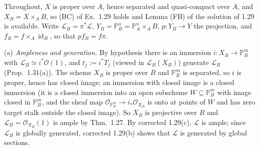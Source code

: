 \documentclass[11pt]{article}
\begin{document}
\pf
Throughout, $X$ is proper over $A$, hence separated and quasi-compact over $A$, and $X_B=X\times_AB$, so (BC) of Ex.~1.29 holds and Lemma (FB) of the solution of 1.29 is available. Write $\mathcal{L}_B=\pi^*\mathcal{L}$, $Y_B=\mathbb{P}^n_B=\mathbb{P}^n_A\times_AB$, $p:Y_B\to Y$ the projection, and $f_B=f\times_A\operatorname{id}_B$, so that $pf_B=f\pi$.

(a) \emph{Ampleness and generation.} By hypothesis there is an immersion $i:X_B\to\mathbb{P}^m_B$ with $\mathcal{L}_B\simeq i^*\mathcal{O}(1)$, and $t_j:=i^*T_j$ (viewed in $\mathcal{L}_B(X_B)$) generate $\mathcal{L}_B$ (Prop.~1.31(a)). The scheme $X_B$ is proper over $B$ and $\mathbb{P}^m_B$ is separated, so $i$ is proper, hence has closed image; an immersion with closed image is a closed immersion (it is a closed immersion into an open subscheme $W\subseteq\mathbb{P}^m_B$ with image closed in $\mathbb{P}^m_B$, and the sheaf map $\mathcal{O}_{\mathbb{P}^m_B}\to i_*\mathcal{O}_{X_B}$ is onto at points of $W$ and has zero target stalk outside the closed image). So $X_B$ is projective over $B$ and $\mathcal{L}_B=\mathcal{O}_{X_B}(1)$ is ample by Thm.~1.27. By corrected 1.29(c), $\mathcal{L}$ is ample; since $\mathcal{L}_B$ is globally generated, corrected 1.29(b) shows that $\mathcal{L}$ is generated by global sections.
\end{document}
